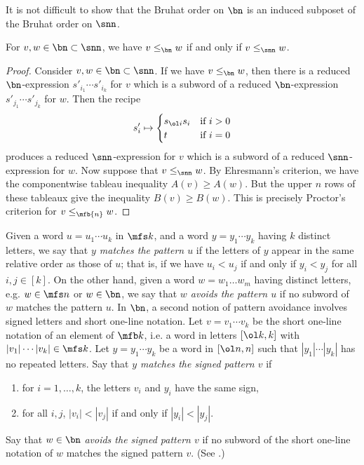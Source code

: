 It is not difficult to show that the Bruhat order on $\bn$ is
an induced subposet of the Bruhat order on $\snn$.
\begin{prop}\label{p:abcbruhat}
  For $v, w \in \bn \subset \snn$, we have $v \leq_{\bn} w$ if and only if
  $v \leq_{\snn} w$.
\end{prop}
\begin{proof}
  Consider $v, w \in \bn \subset \snn$.
  If we have $v \leq_{\bn} w$,
  then there is a reduced $\bn$-expression $s'_{i_1} \cdots s'_{i_k}$ for $v$
  which is a subword of a reduced $\bn$-expression $s'_{j_1} \cdots s'_{j_k}$
  for $w$.
  Then the recipe
  \begin{equation*}
    s'_i \mapsto \begin{cases}
      s_{\ol i} s_i &\text{if $i > 0$}\\
      t &\text{if $i = 0$}
    \end{cases}
  \end{equation*}
  produces a reduced $\snn$-expression for $v$
  which is a subword of a reduced $\snn$-expression for $w$.
  Now suppose that $v \leq_{\snn} w$.
  By Ehresmann's criterion, we have the componentwise
  tableau inequality $A(v) \geq A(w)$.
  But the upper $n$ rows of these tableaux give the inequality $B(v) \geq B(w)$.
  This is precisely Proctor's criterion for $v \leq_{\mfb{n}} w$.
  \end{proof}
  


Given a word $u = u_1 \cdots u_k$ in $\mfs k$,
and a word $y = y_1 \cdots y_k$ having $k$ distinct letters,
we say that {\em $y$ matches the pattern $u$} if the letters of $y$ appear
in the same relative order as those of $u$; that is, if we have
$u_i < u_j$ if and only if $y_i < y_j$ for all $i,j \in [k]$.
On the other hand, given a word $w = w_1\dotsc w_m$ having distinct letters,
e.g. $w \in \mfs n$ or $w \in \bn$,
we say that {\em $w$ avoids the pattern $u$} if no subword
of $w$ matches the pattern $u$.
In $\bn$, a second notion of pattern avoidance
involves signed letters and short one-line notation.
Let $v = v_1 \cdots v_k$ be the short one-line notation of
an element of $\mfb k$,
i.e. a word in
letters $[\ol k, k]$ with
$|v_1| \cdots |v_k| \in \mfs k$.
Let $y = y_1 \cdots y_k$ be a word in $[\ol n, n]$ such that
$|y_1| \cdots |y_k|$ has no repeated letters.
Say that {\em $y$ matches the signed pattern $v$} if
\begin{enumerate}
\item for $i = 1,\dotsc, k$, the letters $v_i$ and $y_i$ have the same sign,
\item for all $i, j$, $|v_i| < |v_j|$ if and only if $|y_i| < |y_j|$.
\end{enumerate}
Say that $w \in \bn$ {\em avoids the signed pattern $v$} if no subword of
the short one-line notation of $w$ matches the signed pattern $v$.
(See \cite[p.\,108]{BilleyLak}.)

